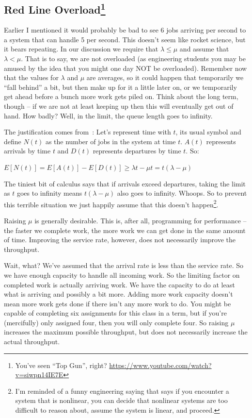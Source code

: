\documentclass[a4paper]{report}
\begin{document}
\subsection*{Red Line Overload\footnote{You've seen ``Top Gun'', right? \url{https://www.youtube.com/watch?v=siwpn14IE7E}}}

Earlier I mentioned it would probably be bad to see 6 jobs arriving per second to a system that can handle 5 per second. This doesn't seem like rocket science, but it bears repeating. In our discussion we require that $\lambda \leq \mu$ and assume that $\lambda < \mu$. That is to say, we are not overloaded (as engineering students you may be amused by the idea that you might one day NOT be overloaded). Remember now that the values for $\lambda$ and $\mu$ are averages, so it could happen that temporarily we ``fall behind'' a bit, but then make up for it a little later on, or we temporarily get ahead before a bunch more work gets piled on. Think about the long term, though -- if we are not at least keeping up then this will eventually get out of hand. How badly? Well, in the limit, the queue length goes to infinity.

The justification comes from~\cite{pmd}: Let's represent time with $t$, its usual symbol and define $N(t)$ as the number of jobs in the system at time $t$. $A(t)$ represents arrivals by time $t$ and $D(t)$ represents departures by time $t$. So:

\begin{center}
	$E[N(t)] = E[A(t)] - E[D(t)] \geq \lambda t - \mu t = t (\lambda - \mu) $
\end{center}

The tiniest bit of calculus says that if arrivals exceed departures, taking the limit as $t$ goes to infinity means $t (\lambda - \mu) $ also goes to infinity. Whoops. So to prevent this terrible situation we just happily assume that this doesn't happen\footnote{I'm reminded of a funny engineering saying that says if you encounter a system that is nonlinear, you can decide that nonlinear systems are too difficult to reason about, assume the system is linear, and proceed.}. 

Raising $\mu$ is generally desirable. This is, after all, programming for performance -- the faster we complete work, the more work we can get done in the same amount of time. Improving the service rate, however, does not necessarily improve the throughput. 

Wait, what? We've assumed that the arrival rate is less than the service rate. So we have enough capacity to handle all incoming work. So the limiting factor on completed work is actually arriving work. We have the capacity to do at least what is arriving and possibly a bit more. Adding more work capacity doesn't mean more work gets done if there isn't any more work to do. You might be capable of completing six assignments for this class in a term, but if you're (mercifully) only assigned four, then you will only complete four. So raising $\mu$ increases the maximum possible throughput, but does not necessarily increase the actual throughput.
\end{document}
